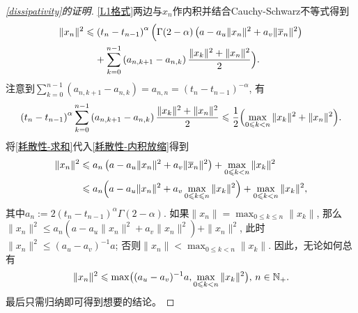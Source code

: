\begin{proof}[\cref{dissipativity}的证明]
    \cref{L1格式}两边与$x_n$作内积并结合Cauchy-Schwarz不等式得到
    \begin{equation}\label{耗散性-内积放缩}
        \begin{aligned}
            \|x_n\|^2&\leqslant \left(t_n-t_{n-1}\right)^\alpha \Bigl( \Gamma(2-\alpha) \left(a-a_u \|x_n\|^2 + a_v \|\overline x_n\|^2\right)
            \\ &\relphantom{\leqslant} + \sum_{k=0}^{n-1} \left(a_{n,k+1}-a_{n,k}\right) \frac{\|x_k\|^2+\|x_n\|^2}{2}\Bigr).
        \end{aligned}
    \end{equation}
    注意到$\sum_{k=0}^{n-1} \left(a_{n,k+1}-a_{n,k}\right)=a_{n,n}=\left(t_n-t_{n-1}\right)^{-\alpha}$, 有
    \begin{equation}\label{耗散性-求和}
        \left(t_n-t_{n-1}\right)^\alpha \sum_{k=0}^{n-1} \left(a_{n,k+1}-a_{n,k}\right) \frac{\|x_k\|^2+\|x_n\|^2}{2}\leqslant\frac{1}{2}\Bigl(\max_{0\leqslant k<n} \|x_k\|^2 + \|x_n\|^2\Bigr).
    \end{equation}
    将\cref{耗散性-求和}代入\cref{耗散性-内积放缩}得到
    \begin{align*}
        \|x_n\|^2 &\leqslant a_n \left(a-a_u \|x_n\|^2 + a_v \|\overline x_n\|^2\right) + \max_{0\leqslant k<n} \|x_k\|^2
        \\ &\leqslant a_n \Bigl(a-a_u \|x_n\|^2 + a_v \max_{0\leqslant k\leqslant n} \|x_k\|^2\Bigr) + \max_{0\leqslant k<n} \|x_k\|^2,
    \end{align*}
    其中$a_n:=2\left(t_n-t_{n-1}\right)^\alpha \Gamma(2-\alpha)$. 如果$\|x_n\|=\max_{0\leqslant k\leqslant n}\|x_k\|$, 那么$\|x_n\|^2 \leqslant a_n \left(a-a_u \|x_n\|^2 + a_v \|x_n\|^2\right) + \|x_n\|^2$, 此时$\|x_n\|^2 \leqslant (a_u-a_v)^{-1}a$; 否则$\|x_n\|<\max_{0\leqslant k<n}\|x_k\|$.
    因此，无论如何总有
    \begin{equation*}
        \|x_n\|^2\leqslant \max\bigl((a_u-a_v)^{-1}a,\max_{0\leqslant k<n}\|x_k\|^2\bigr),\,n\in\mathbb{N_+}.
    \end{equation*}
    最后只需归纳即可得到想要的结论。
\end{proof}

